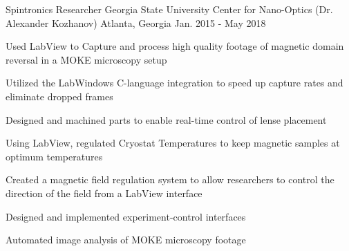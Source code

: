


\begin{cventries}


\cventry
{Spintronics Researcher} %
{Georgia State University Center for Nano-Optics (Dr. Alexander Kozhanov)} %
{Atlanta, Georgia} %
{Jan. 2015 - May 2018} %
{ %
\begin{cvitems}
\item {Used LabView to Capture and process high quality footage of magnetic domain reversal in a MOKE microscopy setup}
\item {Utilized the LabWindows C-language integration to speed up capture rates and eliminate dropped frames}
\item {Designed and machined parts to enable real-time control of lense placement}
\item {Using LabView, regulated Cryostat Temperatures to keep magnetic samples at optimum temperatures}
\item {Created a magnetic field regulation system to allow researchers to control the direction of the field from a LabView interface}
\item {Designed and implemented experiment-control interfaces}
\item {Automated image analysis of MOKE microscopy footage}
\end{cvitems} 
}

\end{cventries}
